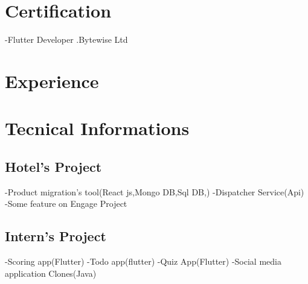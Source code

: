 \documentclass[letterpaper]{twentysecondcv} %
\begin{document}


\section{Certification}
\newline\newline
-Flutter Developer .Bytewise Ltd\newline


\section{Experience}

\begin{twenty} %

	
    
\end{twenty}


\section{Tecnical Informations}
\subsection{Hotel's Project}
-Product migration's tool(React js,Mongo DB,Sql DB,)\newline
-Dispatcher Service(Api)\newline
-Some feature on Engage Project
\newline
\subsection{Intern's Project}
-Scoring app(Flutter)\newline
-Todo app(flutter)\newline
-Quiz App(Flutter)\newline
-Social media application Clones(Java)
\newline
\end{document}
